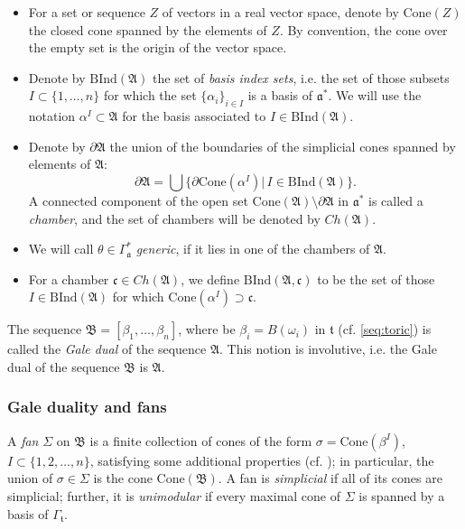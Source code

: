 \documentclass[11pt]{article}
\theoremstyle{definition}
\numberwithin{equation}{section}
\newcommand{\cone}{\mathrm{Cone}}
\newcommand{\A}{\mathfrak{A}}
\newcommand{\B}{\mathfrak{B}}
\begin{document}
\begin{itemize}\label{bind}


 
\item For a set or sequence $Z$ of vectors in a real vector space, denote by 
$\cone(Z)$ the closed cone spanned by the elements of $Z$. 
 By convention, the cone over the empty set is the origin of the vector space.

\item Denote by $\mathrm{BInd}(\mathfrak{A})$ the set of \textit{basis index 
sets}, i.e.  the set of those subsets $I \subset \{1, \ldots, n\}$ for which the 
set $\{\alpha_i\}_{i\in I}$ is a basis of $\mathfrak{a}^*$. We will use the 
notation $\alpha^I\subset \mathfrak{A}$ for the basis associated to $I\in 
\mathrm{BInd}(\mathfrak{A})$. 



\item Denote by $ \partial\mathfrak{A} $ the union of the boundaries of the 
simplicial cones spanned by elements of $ \A $:
\[ \partial\mathfrak{A} = \bigcup\{\partial\cone(\alpha^I)|\,I\in 
\mathrm{BInd}(\mathfrak{A})\}. \]
  A  connected component of the open set $\cone(\A) \setminus 
  \partial\mathfrak{A}$ 
  in $\mathfrak{a}^*$ is called a \textit{chamber}, and the set of chambers will be denoted by $Ch(\A)$.

\item We will call $\theta\in\Gamma_\mathfrak{a}^*$  \textit{generic}, if it 
lies in one of the  chambers of $\A$.

\item For a chamber $\mathfrak{c}\in Ch(\A)$, we define $\mathrm{BInd}(\A, \mathfrak{c})$ to be the set of those $I\in \mathrm{BInd}(\mathfrak{A})$  for which $\cone(\alpha^I)\supset \mathfrak{c}$.



\end{itemize}

The sequence $\mathfrak{B}=[\beta_1,\dots,\beta_n]$, where be  
$\beta_i=B(\omega_i)$ in $\mathfrak{t}$ (cf.  \eqref{seq:toric}) is called the 
\textit{Gale dual} of the sequence $\A$. This notion is involutive, i.e.  the 
Gale dual of the sequence $\mathfrak{B}$ is $ \A $.





\subsubsection{Gale duality and fans}
A \textit{fan} $ \Sigma $ on $ \B $ is a finite collection of cones  of the 
form $\sigma= \cone(\beta^I) $, $ I\subset\{1,2,\dots,n\} $, satisfying some 
additional properties (cf.  \cite[\S1.4]{Fulton}); in particular, the union of  
${\sigma\in\Sigma}$ is the cone $ \cone(\B)$.  A fan is \textit{simplicial} if 
all of its cones are simplicial; further, it is \textit{unimodular} if every 
maximal cone of $\Sigma$ is spanned by a basis of $\Gamma_\mathfrak{t}$.
\end{document}
